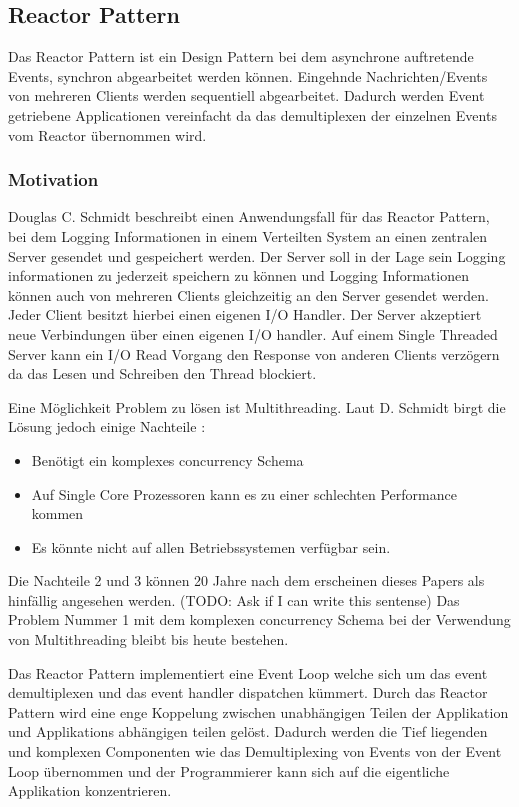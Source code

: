 \subsection{Reactor Pattern}
\label{section:Reactor Pattern}

Das Reactor Pattern ist ein Design Pattern bei dem asynchrone auftretende Events, synchron abgearbeitet werden können. Eingehnde Nachrichten/Events von mehreren Clients werden sequentiell abgearbeitet. Dadurch werden Event getriebene Applicationen vereinfacht da das demultiplexen der einzelnen Events vom Reactor übernommen wird. \cite[p. 1]{Sch95}


\subsubsection{Motivation}

Douglas C. Schmidt beschreibt einen Anwendungsfall für das Reactor Pattern, bei dem Logging Informationen in einem Verteilten System an einen zentralen Server gesendet und gespeichert werden. Der Server soll in der Lage sein Logging informationen zu jederzeit speichern zu können und Logging Informationen können auch von mehreren Clients gleichzeitig an den Server gesendet werden. Jeder Client besitzt hierbei einen eigenen I/O Handler. Der Server akzeptiert neue Verbindungen über einen eigenen I/O handler. Auf einem Single Threaded Server kann ein I/O Read Vorgang den Response von anderen Clients verzögern da das Lesen und Schreiben den Thread blockiert. \cite[p. 1]{Sch95}

Eine Möglichkeit Problem zu lösen ist Multithreading. Laut D. Schmidt birgt die Lösung jedoch einige Nachteile \cite[p. 2]{Sch95}:

\begin{itemize}
  \item Benötigt ein komplexes concurrency Schema
  \item Auf Single Core Prozessoren kann es zu einer schlechten Performance kommen
  \item Es könnte nicht auf allen Betriebssystemen verfügbar sein. 
\end{itemize}

Die Nachteile 2 und 3 können 20 Jahre nach dem erscheinen dieses Papers als hinfällig angesehen werden. (TODO: Ask if I can write this sentense) Das Problem Nummer 1 mit dem komplexen concurrency Schema bei der Verwendung von Multithreading bleibt bis heute bestehen. 

Das Reactor Pattern implementiert eine Event Loop welche sich um das event demultiplexen und das event handler dispatchen kümmert. Durch das Reactor Pattern wird eine enge Koppelung zwischen unabhängigen Teilen der Applikation und Applikations abhängigen teilen gelöst. Dadurch werden die Tief liegenden und komplexen Componenten wie das Demultiplexing von Events von der Event Loop übernommen und der Programmierer kann sich auf die eigentliche Applikation konzentrieren. \cite[p. 2]{Sch95}


